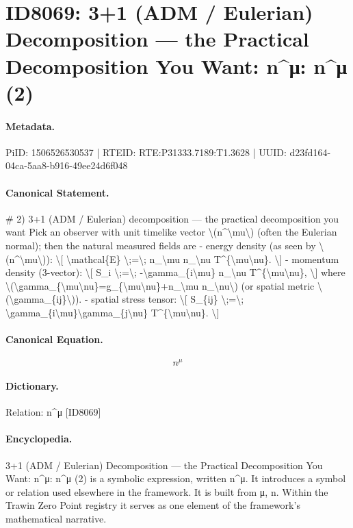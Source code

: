 \section*{ID8069: 3+1 (ADM / Eulerian) Decomposition — the Practical Decomposition You Want: n\textasciicircum{}μ: n\textasciicircum{}μ (2)}
\paragraph{Metadata.}
PiID: 1506526530537 | RTEID: RTE:P31333.7189:T1.3628 | UUID: d23fd164-04ca-5aa8-b916-49ee24d6f048

\paragraph{Canonical Statement.}
\# 2) 3+1 (ADM / Eulerian) decomposition — the practical decomposition you want Pick an observer with unit timelike vector \textbackslash{}(n\textasciicircum{}\textbackslash{}mu\textbackslash{}) (often the Eulerian normal); then the natural measured fields are - energy density (as seen by \textbackslash{}(n\textasciicircum{}\textbackslash{}mu\textbackslash{})): \textbackslash{}[ \textbackslash{}mathcal\{E\} \textbackslash{};=\textbackslash{}; n\_\textbackslash{}mu n\_\textbackslash{}nu T\textasciicircum{}\{\textbackslash{}mu\textbackslash{}nu\}. \textbackslash{}] - momentum density (3-vector): \textbackslash{}[ S\_i \textbackslash{};=\textbackslash{}; -\textbackslash{}gamma\_\{i\textbackslash{}mu\} n\_\textbackslash{}nu T\textasciicircum{}\{\textbackslash{}mu\textbackslash{}nu\}, \textbackslash{}] where \textbackslash{}(\textbackslash{}gamma\_\{\textbackslash{}mu\textbackslash{}nu\}=g\_\{\textbackslash{}mu\textbackslash{}nu\}+n\_\textbackslash{}mu n\_\textbackslash{}nu\textbackslash{}) (or spatial metric \textbackslash{}(\textbackslash{}gamma\_\{ij\}\textbackslash{})). - spatial stress tensor: \textbackslash{}[ S\_\{ij\} \textbackslash{};=\textbackslash{}; \textbackslash{}gamma\_\{i\textbackslash{}mu\}\textbackslash{}gamma\_\{j\textbackslash{}nu\} T\textasciicircum{}\{\textbackslash{}mu\textbackslash{}nu\}. \textbackslash{}]

\paragraph{Canonical Equation.}
\[
n^\mu
\]

\paragraph{Dictionary.}
Relation: n\textasciicircum{}μ [ID8069]

\paragraph{Encyclopedia.}
3+1 (ADM / Eulerian) Decomposition — the Practical Decomposition You Want: n\textasciicircum{}μ: n\textasciicircum{}μ (2) is a symbolic expression, written n\textasciicircum{}μ. It introduces a symbol or relation used elsewhere in the framework. It is built from μ, n. Within the Trawin Zero Point registry it serves as one element of the framework's mathematical narrative.
